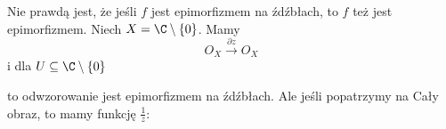 \begin{example}
\item Nie prawdą jest, że jeśli $f$ jest epimorfizmem na źdźbłach, to $f$ też jest epimorfizmem. Niech $X=\C\setminus\{0\}$. Mamy
  $$O_X\xrightarrow{\partial z} O_X$$
  i dla $U\subseteq \C\setminus\{0\}$ 
  \begin{center}\end{center}
  to odwzorowanie jest epimorfizmem na źdźbłach. Ale jeśli popatrzymy na Cały obraz, to mamy funkcję $\frac{1}{z}$:
  \begin{center}\end{center}
\end{example}

